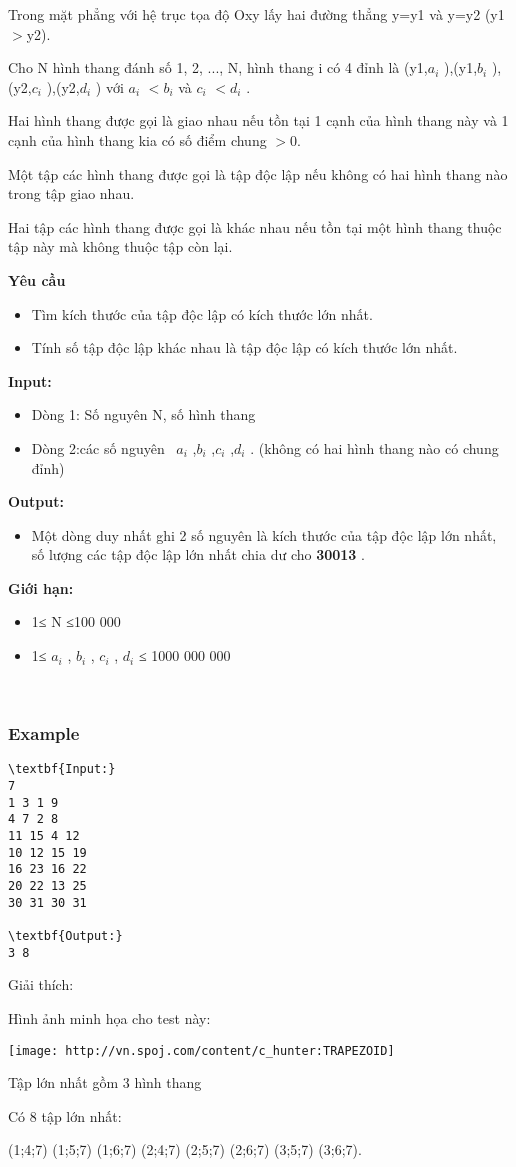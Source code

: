 

Trong mặt phẳng với hệ trục tọa độ Oxy lấy hai đường thẳng y=y1 và y=y2 (y1$>$y2).

Cho N hình thang đánh số 1, 2, ..., N, hình thang i có 4 đỉnh là (y1,$a_{i}$ ),(y1,$b_{i}$ ),(y2,$c_{i}$ ),(y2,$d_{i}$ ) với $a_{i}$ $<$$b_{i}$ và $c_{i}$ $<$$d_{i}$ .

Hai hình thang được gọi là giao nhau nếu tồn tại 1 cạnh của hình thang này và 1 cạnh của hình thang kia có số điểm chung $>$0.

Một tập các hình thang được gọi là tập độc lập nếu không có hai hình thang nào trong tập giao nhau.

Hai tập các hình thang được gọi là khác nhau nếu tồn tại một hình thang thuộc tập này mà không thuộc tập còn lại.

\textbf{Yêu cầu}
\begin{itemize}
	\item Tìm kích thước của tập độc lập có kích thước lớn nhất.
	\item Tính số tập độc lập khác nhau là tập độc lập có kích thước lớn nhất.
\end{itemize}

\textbf{Input: }
\begin{itemize}
	\item Dòng 1: Số nguyên N, số hình thang
	\item Dòng 2:các số nguyên  $a_{i}$ ,$b_{i}$ ,$c_{i}$ ,$d_{i}$ . (không có hai hình thang nào có chung đỉnh)
\end{itemize}

\textbf{Output: }
\begin{itemize}
	\item Một dòng duy nhất ghi 2 số nguyên là kích thước của tập độc lập lớn nhất, số lượng các tập độc lập lớn nhất chia dư cho \textbf{ 30013 } .
\end{itemize}

\textbf{Giới hạn: }
\begin{itemize}
	\item 1≤ N ≤100 000
	\item 1≤ $a_{i}$ , $b_{i}$ , $c_{i}$ , $d_{i}$ ≤ 1000 000 000
\end{itemize}

 

\subsubsection{Example}
\begin{verbatim}
\textbf{Input:}
7
1 3 1 9
4 7 2 8
11 15 4 12
10 12 15 19
16 23 16 22
20 22 13 25
30 31 30 31

\textbf{Output:}
3 8\end{verbatim}




Giải thích:


Hình ảnh minh họa cho test này:






\texttt{[image: http://vn.spoj.com/content/c\_hunter:TRAPEZOID]}





Tập lớn nhất gồm 3 hình thang


Có 8 tập lớn nhất:


(1;4;7) (1;5;7) (1;6;7) (2;4;7) (2;5;7) (2;6;7) (3;5;7) (3;6;7).
